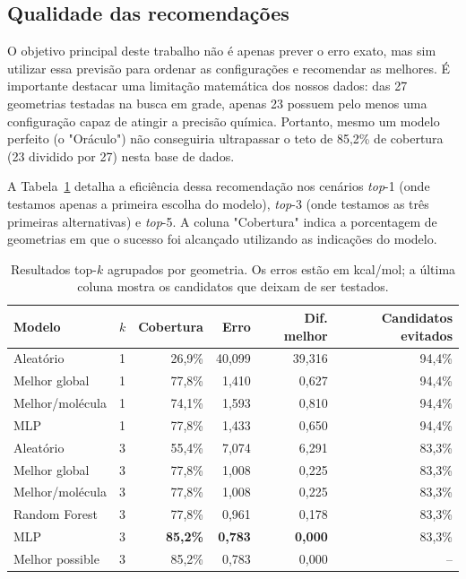 \subsection{Qualidade das recomendações}

O objetivo principal deste trabalho não é apenas prever o erro exato, mas sim 
utilizar essa previsão para ordenar as configurações e recomendar as melhores. É 
importante destacar uma limitação matemática dos nossos dados: das 27 geometrias 
testadas na busca em grade, apenas 23 possuem pelo menos uma configuração capaz de 
atingir a precisão química. Portanto, mesmo um modelo perfeito (o "Oráculo") não 
conseguiria ultrapassar o teto de 85,2\% de cobertura (23 dividido por 27) nesta 
base de dados.

A Tabela~\ref{tab:topk} detalha a eficiência dessa recomendação nos cenários 
\textit{top}-1 (onde testamos apenas a primeira escolha do modelo), \textit{top}-3 
(onde testamos as três primeiras alternativas) e \textit{top}-5. A coluna 
"Cobertura" indica a porcentagem de geometrias em que o sucesso foi alcançado 
utilizando as indicações do modelo.

\begin{table}[!ht]
\centering
\caption{Resultados top-$k$ agrupados por geometria. Os erros estão em kcal/mol;
a última coluna mostra os candidatos que deixam de ser testados.}
\label{tab:topk}
\begin{tabular}{llrrrr}
\toprule
Modelo & $k$ & Cobertura & Erro & Dif. melhor & Candidatos evitados \\
\midrule
Aleatório       & 1 & 26,9\% & 40,099 & 39,316 & 94,4\% \\
Melhor global   & 1 & 77,8\% &  1,410 &  0,627 & 94,4\% \\
Melhor/molécula & 1 & 74,1\% &  1,593 &  0,810 & 94,4\% \\
MLP             & 1 & 77,8\% &  1,433 &  0,650 & 94,4\% \\
\midrule
Aleatório       & 3 & 55,4\% &  7,074 &  6,291 & 83,3\% \\
Melhor global   & 3 & 77,8\% &  1,008 &  0,225 & 83,3\% \\
Melhor/molécula & 3 & 77,8\% &  1,008 &  0,225 & 83,3\% \\
Random Forest   & 3 & 77,8\% &  0,961 &  0,178 & 83,3\% \\
MLP             & 3 & \textbf{85,2\%} & \textbf{0,783} & \textbf{0,000} & 83,3\% \\
Melhor possible & 3 & 85,2\% & 0,783 & 0,000 & -- \\
\bottomrule
\end{tabular}
\end{table}

